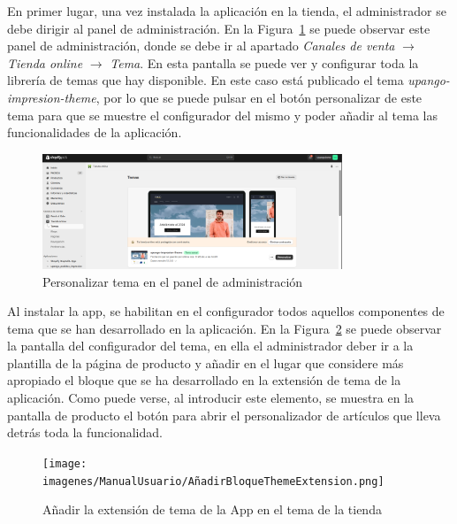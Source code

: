 \documentclass[11pt]{article}
\begin{document}
En primer lugar, una vez instalada la aplicación en la tienda, el administrador se debe dirigir al panel de administración. En la Figura~\ref{fig:PersonalizarTema} se puede observar este panel de administración, donde
se debe ir al apartado \textit{Canales de venta} $\rightarrow$  \textit{Tienda online} $\rightarrow$  \textit{Tema}. En esta pantalla se puede ver y configurar toda la librería de temas que hay disponible.
En este caso está publicado el tema \textit{upango-impresion-theme}, por lo que se puede pulsar en el botón personalizar de este tema para que se muestre el configurador del mismo y poder
añadir al tema las funcionalidades de la aplicación.

\begin{figure}[H]
    \centering
    \includegraphics[width=0.8\textwidth]{imagenes/ManualUsuario/PantallaDePersonalizarTema.png}
    \caption{\label{fig:PersonalizarTema}Personalizar tema en el panel de administración}
    \vspace{\fill}
\end{figure}

Al instalar la app, se habilitan en el configurador todos aquellos componentes de tema que se han desarrollado en la aplicación.
En la Figura~\ref{fig:ThemeAppExtension} se puede observar la pantalla del configurador del tema, en ella el administrador deber ir a la plantilla de la página de producto y añadir
en el lugar que considere más apropiado el bloque que se ha desarrollado en la extensión de tema de la aplicación. Como puede verse, al introducir este elemento, se muestra en la pantalla de producto
el botón para abrir el personalizador de artículos que lleva detrás toda la funcionalidad.

\begin{figure}[H]
    \centering
    \texttt{[image: imagenes/ManualUsuario/AñadirBloqueThemeExtension.png]}
    \caption{\label{fig:ThemeAppExtension}Añadir la extensión de tema de la App en el tema de la tienda}
    \vspace{\fill}
\end{figure}
\end{document}
